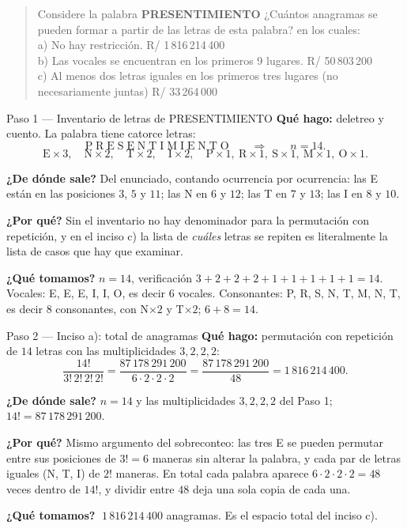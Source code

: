 \documentclass[11pt]{article}
\begin{document}
\begin{quote}
Considere la palabra \textbf{PRESENTIMIENTO} ¿Cuántos anagramas se pueden formar a partir de las letras de
esta palabra? en los cuales:\\
a) No hay restricción. \hfill R/ 1\,816\,214\,400\\
b) Las vocales se encuentran en los primeros 9 lugares. \hfill R/ 50\,803\,200\\
c) Al menos dos letras iguales en los primeros tres lugares (no necesariamente juntas)
\hfill R/ 33\,264\,000
\end{quote}

\begin{paso}{Paso 1 --- Inventario de letras de PRESENTIMIENTO}
\textbf{Qué hago:} deletreo y cuento. La palabra tiene catorce letras:
\[
\text{P}\;\text{R}\;\text{E}\;\text{S}\;\text{E}\;\text{N}\;\text{T}\;\text{I}\;\text{M}\;\text{I}\;\text{E}\;\text{N}\;\text{T}\;\text{O}
\qquad\Longrightarrow\qquad n=14 .
\]
\[
\text{E}\times 3,\quad \text{N}\times 2,\quad \text{T}\times 2,\quad \text{I}\times 2,\quad
\text{P}\times 1,\ \text{R}\times 1,\ \text{S}\times 1,\ \text{M}\times 1,\ \text{O}\times 1 .
\]

\textbf{¿De dónde sale?} Del enunciado, contando ocurrencia por ocurrencia: las E están en las posiciones
$3$, $5$ y $11$; las N en $6$ y $12$; las T en $7$ y $13$; las I en $8$ y $10$.

\textbf{¿Por qué?} Sin el inventario no hay denominador para la permutación con repetición, y en el
inciso c) la lista de \emph{cuáles} letras se repiten es literalmente la lista de casos que hay que
examinar.

\textbf{¿Qué tomamos?} $n=14$, verificación $3+2+2+2+1+1+1+1+1=14$. Vocales: E, E, E, I, I, O, es decir
$6$ vocales. Consonantes: P, R, S, N, T, M, N, T, es decir $8$ consonantes, con N$\times2$ y T$\times2$;
$6+8=14$.
\end{paso}

\begin{paso}{Paso 2 --- Inciso a): total de anagramas}
\textbf{Qué hago:} permutación con repetición de $14$ letras con las multiplicidades $3,2,2,2$:
\[
\frac{14!}{3!\,2!\,2!\,2!}=\frac{87\,178\,291\,200}{6\cdot 2\cdot 2\cdot 2}
=\frac{87\,178\,291\,200}{48}=1\,816\,214\,400 .
\]

\textbf{¿De dónde sale?} $n=14$ y las multiplicidades $3,2,2,2$ del Paso 1; $14!=87\,178\,291\,200$.

\textbf{¿Por qué?} Mismo argumento del sobreconteo: las tres E se pueden permutar entre sus posiciones de
$3!=6$ maneras sin alterar la palabra, y cada par de letras iguales (N, T, I) de $2!$ maneras. En total
cada palabra aparece $6\cdot2\cdot2\cdot2=48$ veces dentro de $14!$, y dividir entre $48$ deja una sola
copia de cada una.

\textbf{¿Qué tomamos?} $\;1\,816\,214\,400$ anagramas. Es el espacio total del inciso c).
\end{paso}
\end{document}
